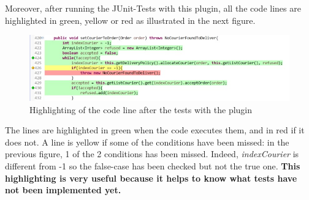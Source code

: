 Moreover, after running the JUnit-Tests with this plugin, all the code lines are highlighted in green, yellow or red as illustrated in the next figure.
\begin{figure}[H]
	\centering
	\includegraphics[width=1\linewidth]{./ima/testlinecolor.jpg}
	\caption{Highlighting of the code line after the tests with the plugin}
	\label{fig:line-test-plugin}
\end{figure}
The lines are highlighted in green when the code executes them, and in red if it does not. A line is yellow if some of the conditions have been missed: in the previous figure, 1 of the 2 conditions has been missed. Indeed, \textit{indexCourier} is different from -1 so the false-case has been checked but not the true one. \textbf{This highlighting is very useful because it helps to know what tests have not been implemented yet.}



